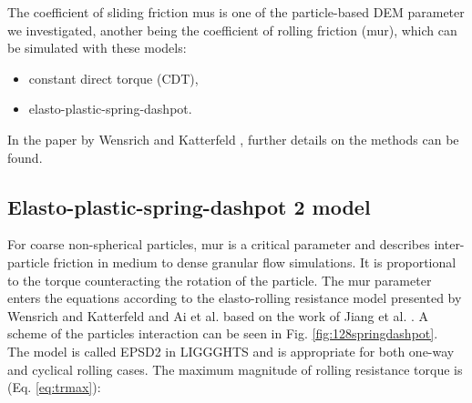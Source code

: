 The coefficient of sliding friction \acs{mus} is 
one of the particle-based \acs{DEM} parameter we investigated, 
another being the coefficient of rolling friction (\acs{mur}),
which can be simulated with these models:
\begin{itemize}
  \item{constant direct torque (CDT),}
  \item{elasto-plastic-spring-dashpot.}
\end{itemize}

In the paper by Wensrich and Katterfeld \cite{RefWorks:87}, further details on
the methods can be found.\\



% 


% 
% 
% 
% 
% 

\subsection{Elasto-plastic-spring-dashpot 2 model}
\label{subsec:epsd2}

For coarse non-spherical particles, \acs{mur} is a critical parameter and describes
inter-particle friction in medium to dense granular flow simulations. 
It is proportional to the 
torque counteracting the rotation of the particle. 
The \acs{mur} parameter enters the 
equations according to the elasto-rolling resistance model presented by Wensrich and 
Katterfeld \cite{RefWorks:87} and Ai et al. \cite{RefWorks:131} 
based on the work of Jiang et al. \cite{RefWorks:143}. 
A scheme of the particles interaction can be seen in Fig.
\ref{fig:128springdashpot}.\\

The model is called EPSD2 in \acs{LIGGGHTS} and is appropriate for both one-way and cyclical rolling cases.
The maximum magnitude of rolling resistance torque is (Eq. \ref{eq:trmax}):

